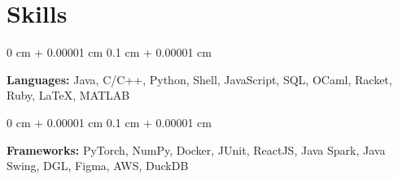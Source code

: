 \documentclass[10pt, letterpaper]{article}
\newenvironment{highlights}{
    \begin{itemize}[
        topsep=0.1 cm,
        parsep=0.10 cm,
        partopsep=0pt,
        itemsep=0pt,
        leftmargin=0.4 cm + 10pt
    ]
}{
    \end{itemize}
} %
\newenvironment{onecolentry}{
    \begin{adjustwidth}{
        0 cm + 0.00001 cm
    }{
        0.1 cm + 0.00001 cm
    }
}{
    \end{adjustwidth}
} %
\newenvironment{twocolentry}[2][]{
    \onecolentry
    \def\secondColumn{#2}
    \setcolumnwidth{\fill, 4.5 cm}
    \begin{paracol}{2}
}{
    \switchcolumn \raggedleft \secondColumn
    \end{paracol}
    \endonecolentry
} %
\begin{document}



    
    \section{Skills}

        
        \begin{onecolentry}
            \textbf{Languages:} Java, C/C++, Python, Shell, JavaScript, SQL, OCaml, Racket, Ruby, LaTeX, MATLAB
        \end{onecolentry}

        \vspace{0.2 cm}

        \begin{onecolentry}
            \textbf{Frameworks:} PyTorch, NumPy, Docker, JUnit, ReactJS, Java Spark, Java Swing, DGL, Figma, AWS, DuckDB
        \end{onecolentry}


    
\end{document}
